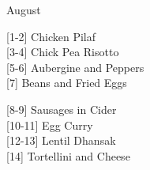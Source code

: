 		\begin{menu}{August}
    
    \begin{recipelist}
    
        {\scriptsize[1-2]} Chicken Pilaf\\
        {\scriptsize[3-4]} Chick Pea Risotto\\
        {\scriptsize[5-6]} Aubergine and Peppers\\
        {\scriptsize[7]} Beans and Fried Eggs\\%
    \end{recipelist}%
    \begin{recipelist}
    
        {\scriptsize[8-9]} Sausages in Cider\\
        {\scriptsize[10-11]} Egg Curry\\
        {\scriptsize[12-13]} Lentil Dhansak\\
        {\scriptsize[14]} Tortellini and Cheese\\%
    \end{recipelist}\par%
  

\end{menu}
